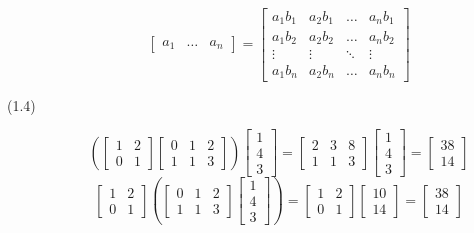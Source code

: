 \documentclass[openany]{book}
\begin{document}
\begin{description}
$$\begin{bmatrix}
a_1 & \hdots & a_n
\end{bmatrix} = \begin{bmatrix}
a_1b_1 & a_2b_1 & \hdots & a_nb_1 \\
a_1b_2 & a_2b_2 & \hdots & a_nb_2 \\
\vdots & \vdots & \ddots & \vdots \\
a_1b_n & a_2b_n & \hdots & a_nb_n
\end{bmatrix}$$
\item[(1.4)]
$$\left( \begin{bmatrix}
1 & 2 \\
0 & 1
\end{bmatrix}\begin{bmatrix}
0 & 1 & 2 \\
1 & 1 & 3
\end{bmatrix} \right)\begin{bmatrix}
1 \\
4 \\
3
\end{bmatrix} = \begin{bmatrix}
2 & 3 & 8 \\
1 & 1 & 3
\end{bmatrix}\begin{bmatrix}
1 \\
4 \\
3
\end{bmatrix} = \begin{bmatrix}
38 \\
14
\end{bmatrix}$$
$$\begin{bmatrix}
1 & 2 \\
0 & 1
\end{bmatrix} \left(\begin{bmatrix}
0 & 1 & 2 \\
1 & 1 & 3
\end{bmatrix}\begin{bmatrix}
1 \\
4 \\
3
\end{bmatrix} \right) = \begin{bmatrix}
1 & 2 \\
0 & 1
\end{bmatrix}\begin{bmatrix}
10 \\
14
\end{bmatrix} = \begin{bmatrix}
38 \\
14
\end{bmatrix}$$

\end{description}
\end{document}
